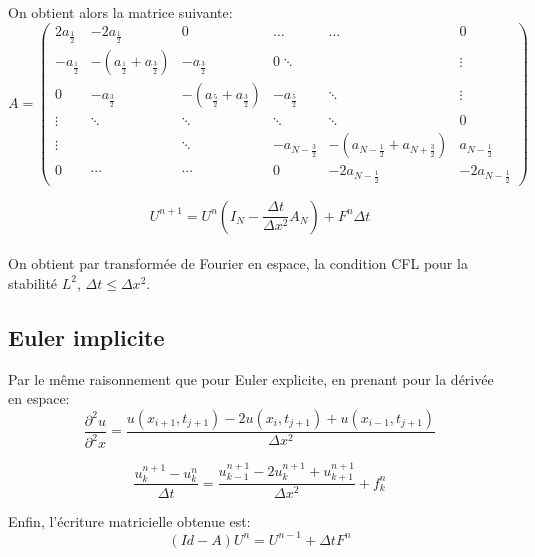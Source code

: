 \documentclass[a4paper,12pt,twoside]{report}
\begin{document}
On obtient alors la matrice suivante: \\

\begin{equation}
A = 
\begin{pmatrix}
   2 a_{\frac{1}{2}} & -2 a_{\frac{1}{2}} & 0 & \ldots & \ldots & 0\\
   -a_{\frac{1}{2}} & - (a_{\frac{1}{2}} + a_{\frac{3}{2}} ) & -a_{\frac{3}{2}} & 0 \ddots & & \vdots \\
   0 & -a_{\frac{3}{2}} & - (a_{\frac{5}{2}} + a_{\frac{3}{2}} ) & -a_{\frac{5}{2}} & \ddots & \vdots\\
   \vdots & \ddots & \ddots & \ddots &\ddots & 0\\
   \vdots & & \ddots & -a_{N -\frac{3}{2}} & - (a_{N - \frac{1}{2}} + a_{N +\frac{3}{2}} ) & a_{N - \frac{1}{2}}\\
   0 & \cdots & \cdots & 0 & -2 a_{N -\frac{1}{2}} & -2 a_{N -\frac{1}{2}}
\end{pmatrix}
\end{equation}




$$U^{n+1} = U^n(I_N - \frac{\Delta t}{ \Delta x^2} A_N)  + F^n \Delta t $$ \\

On obtient par transformée de Fourier en espace, la condition CFL pour la stabilité $L^2$, $\Delta t \leq \Delta x^2$.\\



\subsection{Euler implicite}
Par le même raisonnement que pour Euler explicite, en prenant pour la dérivée en espace:\\
\begin{equation}
\frac{\partial ^2u}{\partial ^2x} = \frac{u(x_{i+1},t_{j+1}) - 2u(x_i,t_{j+1}) + u(x_{i-1},t_{j+1})}{\Delta x^2}
\end{equation}

$$\frac{u_{k} ^{n+1} - u_{k} ^{n}}{ \Delta t} = \frac{u_{k-1} ^{n+1} - 2u_k ^{n+1} + u_{k+1} ^{n+1}}{\Delta x^2} + f_k ^n $$

Enfin, l'écriture matricielle obtenue est:\\

$$ (Id - A)U^n = U^{n-1} + \Delta t F^n $$



\smallbreak
\end{document}
